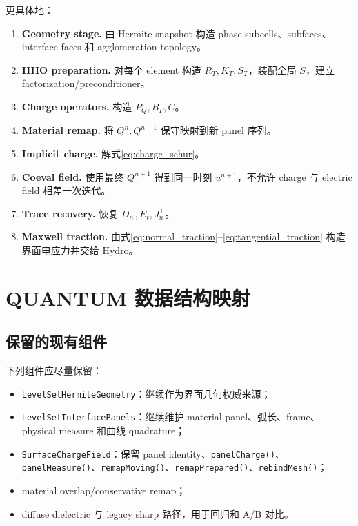 \documentclass[UTF8,a4paper,11pt]{ctexart}
\begin{document}
更具体地：
\begin{enumerate}[label=\textbf{A\arabic*.}]
  \item \textbf{Geometry stage.} 由 Hermite snapshot 构造 phase subcells、subfaces、interface faces 和 agglomeration topology。
  \item \textbf{HHO preparation.} 对每个 element 构造 \(R_T,K_T,S_T\)，装配全局 \(S\)，建立 factorization/preconditioner。
  \item \textbf{Charge operators.} 构造 \(P_Q,B_\Gamma,C\)。
  \item \textbf{Material remap.} 将 \(Q^n,Q^{n-1}\) 保守映射到新 panel 序列。
  \item \textbf{Implicit charge.} 解式\eqref{eq:charge_schur}。
  \item \textbf{Coeval field.} 使用最终 \(Q^{n+1}\) 得到同一时刻 \(u^{n+1}\)，不允许 charge 与 electric field 相差一次迭代。
  \item \textbf{Trace recovery.} 恢复 \(D_n^\pm,E_t,J_n^\pm\)。
  \item \textbf{Maxwell traction.} 由式\eqref{eq:normal_traction}--\eqref{eq:tangential_traction} 构造界面电应力并交给 Hydro。
\end{enumerate}

\section{QUANTUM 数据结构映射}

\subsection{保留的现有组件}

下列组件应尽量保留：
\begin{itemize}
  \item \texttt{LevelSetHermiteGeometry}：继续作为界面几何权威来源；
  \item \texttt{LevelSetInterfacePanels}：继续维护 material panel、弧长、frame、physical measure 和曲线 quadrature；
  \item \texttt{SurfaceChargeField}：保留 panel identity、\texttt{panelCharge()}、\texttt{panelMeasure()}、\texttt{remapMoving()}、\texttt{remapPrepared()}、\texttt{rebindMesh()}；
  \item material overlap/conservative remap；
  \item diffuse dielectric 与 legacy sharp 路径，用于回归和 A/B 对比。
\end{itemize}
\end{document}
